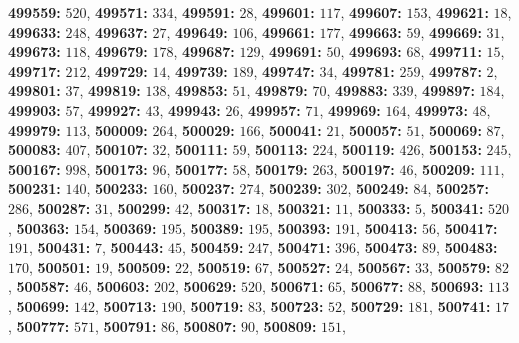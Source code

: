 \textsf{\bfseries 499559:} $520$, \textsf{\bfseries 499571:} $334$, \textsf{\bfseries 499591:} $28$, \textsf{\bfseries 499601:} $117$, \textsf{\bfseries 499607:} $153$, \textsf{\bfseries 499621:} $18$, \textsf{\bfseries 499633:} $248$, \textsf{\bfseries 499637:} $27$, \textsf{\bfseries 499649:} $106$, \textsf{\bfseries 499661:} $177$, \textsf{\bfseries 499663:} $59$, \textsf{\bfseries 499669:} $31$, \textsf{\bfseries 499673:} $118$, \textsf{\bfseries 499679:} $178$, \textsf{\bfseries 499687:} $129$, \textsf{\bfseries 499691:} $50$, \textsf{\bfseries 499693:} $68$, \textsf{\bfseries 499711:} $15$, \textsf{\bfseries 499717:} $212$, \textsf{\bfseries 499729:} $14$, \textsf{\bfseries 499739:} $189$, \textsf{\bfseries 499747:} $34$, \textsf{\bfseries 499781:} $259$, \textsf{\bfseries 499787:} $2$, \textsf{\bfseries 499801:} $37$, \textsf{\bfseries 499819:} $138$, \textsf{\bfseries 499853:} $51$, \textsf{\bfseries 499879:} $70$, \textsf{\bfseries 499883:} $339$, \textsf{\bfseries 499897:} $184$, \textsf{\bfseries 499903:} $57$, \textsf{\bfseries 499927:} $43$, \textsf{\bfseries 499943:} $26$, \textsf{\bfseries 499957:} $71$, \textsf{\bfseries 499969:} $164$, \textsf{\bfseries 499973:} $48$, \textsf{\bfseries 499979:} $113$, \textsf{\bfseries 500009:} $264$, \textsf{\bfseries 500029:} $166$, \textsf{\bfseries 500041:} $21$, \textsf{\bfseries 500057:} $51$, \textsf{\bfseries 500069:} $87$, \textsf{\bfseries 500083:} $407$, \textsf{\bfseries 500107:} $32$, \textsf{\bfseries 500111:} $59$, \textsf{\bfseries 500113:} $224$, \textsf{\bfseries 500119:} $426$, \textsf{\bfseries 500153:} $245$, \textsf{\bfseries 500167:} $998$, \textsf{\bfseries 500173:} $96$, \textsf{\bfseries 500177:} $58$, \textsf{\bfseries 500179:} $263$, \textsf{\bfseries 500197:} $46$, \textsf{\bfseries 500209:} $111$, \textsf{\bfseries 500231:} $140$, \textsf{\bfseries 500233:} $160$, \textsf{\bfseries 500237:} $274$, \textsf{\bfseries 500239:} $302$, \textsf{\bfseries 500249:} $84$, \textsf{\bfseries 500257:} $286$, \textsf{\bfseries 500287:} $31$, \textsf{\bfseries 500299:} $42$, \textsf{\bfseries 500317:} $18$, \textsf{\bfseries 500321:} $11$, \textsf{\bfseries 500333:} $5$, \textsf{\bfseries 500341:} $520$, \textsf{\bfseries 500363:} $154$, \textsf{\bfseries 500369:} $195$, \textsf{\bfseries 500389:} $195$, \textsf{\bfseries 500393:} $191$, \textsf{\bfseries 500413:} $56$, \textsf{\bfseries 500417:} $191$, \textsf{\bfseries 500431:} $7$, \textsf{\bfseries 500443:} $45$, \textsf{\bfseries 500459:} $247$, \textsf{\bfseries 500471:} $396$, \textsf{\bfseries 500473:} $89$, \textsf{\bfseries 500483:} $170$, \textsf{\bfseries 500501:} $19$, \textsf{\bfseries 500509:} $22$, \textsf{\bfseries 500519:} $67$, \textsf{\bfseries 500527:} $24$, \textsf{\bfseries 500567:} $33$, \textsf{\bfseries 500579:} $82$, \textsf{\bfseries 500587:} $46$, \textsf{\bfseries 500603:} $202$, \textsf{\bfseries 500629:} $520$, \textsf{\bfseries 500671:} $65$, \textsf{\bfseries 500677:} $88$, \textsf{\bfseries 500693:} $113$, \textsf{\bfseries 500699:} $142$, \textsf{\bfseries 500713:} $190$, \textsf{\bfseries 500719:} $83$, \textsf{\bfseries 500723:} $52$, \textsf{\bfseries 500729:} $181$, \textsf{\bfseries 500741:} $17$, \textsf{\bfseries 500777:} $571$, \textsf{\bfseries 500791:} $86$, \textsf{\bfseries 500807:} $90$, \textsf{\bfseries 500809:} $151$, 
